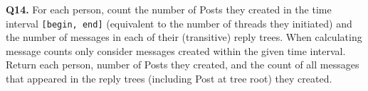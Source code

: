 \textbf{Q14.}
For each person, count the number of Posts they created in the time
interval \texttt{{[}begin,\ end{]}} (equivalent to the number of threads
they initiated) and the number of messages in each of their (transitive)
reply trees. When calculating message counts only consider messages
created within the given time interval.
Return each person, number of Posts they created, and the count of all
messages that appeared in the reply trees (including Post at tree root)
they created.
